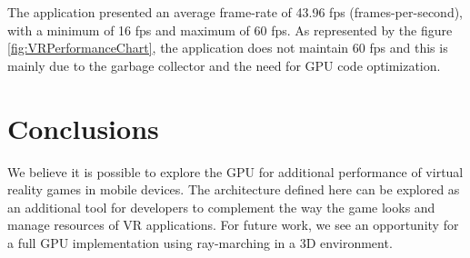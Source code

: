 \documentclass[runningheads]{llncs}
\begin{document}
The application presented an average frame-rate of 43.96 fps (frames-per-second), with a minimum of 16 fps and maximum of 60 fps. As represented by the figure \ref{fig:VRPerformanceChart}, the application does not maintain 60 fps and this is mainly due to the garbage collector and the need for GPU code optimization.


\section{Conclusions}
We believe it is possible to explore the GPU for additional performance of virtual reality games in mobile devices. The architecture defined here can be explored as an additional tool for developers to complement the way the game looks and manage resources of VR applications. For future work, we see an opportunity for a full GPU implementation using ray-marching in a 3D environment.
%
%
%


\end{document}
